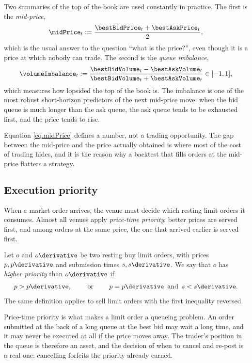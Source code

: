 Two summaries of the top of the book are used constantly in practice.
The first is the \emph{mid-price},
\begin{equation}
\label{eq.midPrice}
\midPrice_t := \frac{\bestBidPrice_t + \bestAskPrice_t}{2},
\end{equation}
which is the usual answer to the question ``what is the price?'',
even though it is a price at which nobody can trade.
The second is the \emph{queue imbalance},
\begin{equation}
\label{eq.volumeImbalance}
\volumeImbalance_t := \frac{\bestBidVolume_t - \bestAskVolume_t}{\bestBidVolume_t + \bestAskVolume_t} \in [-1,1],
\end{equation}
which measures how lopsided the top of the book is.
The imbalance is one of the most robust short-horizon predictors of the next mid-price move:
when the bid queue is much longer than the ask queue,
the ask queue tends to be exhausted first, and the price tends to rise.

\begin{remark}
\label{remark.midPriceIsNotTradeable}
Equation \eqref{eq.midPrice} defines a number, not a trading opportunity.
The gap between the mid-price and the price actually obtained
is where most of the cost of trading hides,
and it is the reason why a backtest that fills orders at the mid-price
flatters a strategy.
\end{remark}

\subsection{Execution priority}
\label{sec.executionPriority}

When a market order arrives, the venue must decide which resting limit orders it consumes.
Almost all venues apply \emph{price-time priority}:
better prices are served first,
and among orders at the same price,
the one that arrived earlier is served first.

\begin{defi}
\label{def.executionPriority}
Let $o$ and $o\derivative$ be two resting buy limit orders,
with prices $p, p\derivative$ and submission times $s, s\derivative$.
We say that $o$ has \emph{higher priority} than $o\derivative$ if
\begin{equation}
\label{eq.orderingOfLimitOrders}
p > p\derivative,
\qquad \text{ or } \qquad
p = p\derivative \, \text{ and } \, s < s\derivative.
\end{equation}
The same definition applies to sell limit orders with the first inequality reversed.
\end{defi}

Price-time priority is what makes a limit order a queueing problem.
An order submitted at the back of a long queue at the best bid
may wait a long time,
and it may never be executed at all if the price moves away.
The trader's position in the queue is therefore an asset,
and the decision of when to cancel and re-post is a real one:
cancelling forfeits the priority already earned.
